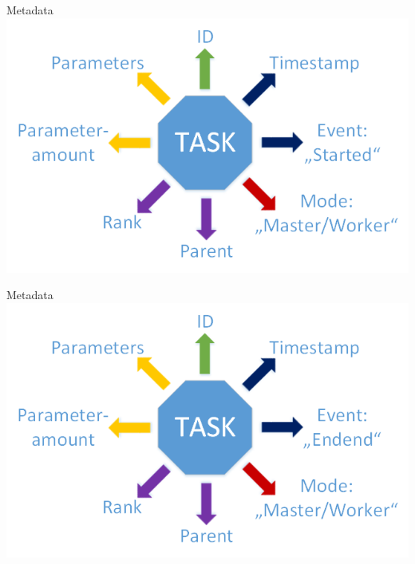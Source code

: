 	\begin{frame}{Metadata}
	\includegraphics[width=1.0\textwidth]{images/Task/Zeichnung2.png}
	\end{frame}
	
	\begin{frame}{Metadata}
	\includegraphics[width=1.0\textwidth]{images/Task/Zeichnung3.png}
	\end{frame}
	
	
